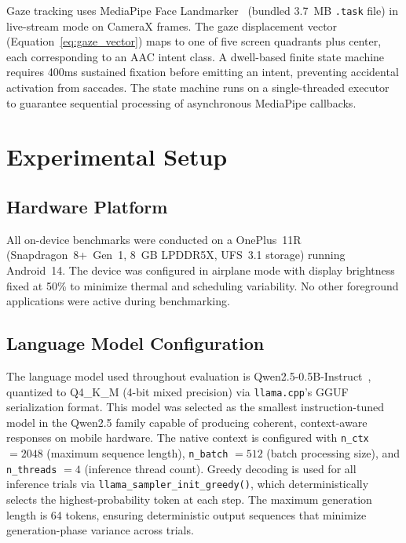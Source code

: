 \documentclass[journal]{IEEEtran}
\begin{document}
Gaze tracking uses MediaPipe Face Landmarker~\cite{mediapipe} (bundled 3.7~MB \texttt{.task} file) in live-stream mode on CameraX frames. The gaze displacement vector (Equation~\ref{eq:gaze_vector}) maps to one of five screen quadrants plus center, each corresponding to an AAC intent class. A dwell-based finite state machine requires 400ms sustained fixation before emitting an intent, preventing accidental activation from saccades. The state machine runs on a single-threaded executor to guarantee sequential processing of asynchronous MediaPipe callbacks.

\section{Experimental Setup}
\label{sec:experiments}

\subsection{Hardware Platform}
\label{sec:hardware}

All on-device benchmarks were conducted on a OnePlus~11R (Snapdragon~8+~Gen~1, 8~GB LPDDR5X, UFS~3.1 storage) running Android~14. The device was configured in airplane mode with display brightness fixed at 50\% to minimize thermal and scheduling variability. No other foreground applications were active during benchmarking.

\subsection{Language Model Configuration}
\label{sec:model_config}

The language model used throughout evaluation is Qwen2.5-0.5B-Instruct~\cite{qwen25}, quantized to Q4\_K\_M (4-bit mixed precision) via \texttt{llama.cpp}'s GGUF serialization format. This model was selected as the smallest instruction-tuned model in the Qwen2.5 family capable of producing coherent, context-aware responses on mobile hardware. The native context is configured with \texttt{n\_ctx} $= 2048$ (maximum sequence length), \texttt{n\_batch} $= 512$ (batch processing size), and \texttt{n\_threads} $= 4$ (inference thread count). Greedy decoding is used for all inference trials via \texttt{llama\_sampler\_init\_greedy()}, which deterministically selects the highest-probability token at each step. The maximum generation length is 64 tokens, ensuring deterministic output sequences that minimize generation-phase variance across trials.
\end{document}

